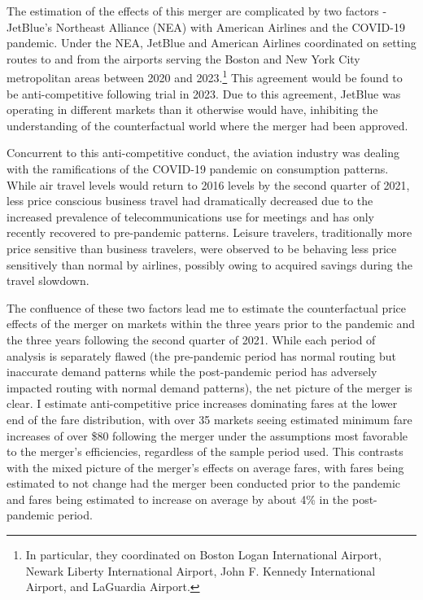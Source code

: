 \documentclass{article}
\begin{document}
    The estimation of the effects of this merger are complicated by two factors - JetBlue's Northeast Alliance (NEA) with American Airlines and the COVID-19 pandemic. Under the NEA, JetBlue and American Airlines coordinated on setting routes to and from the airports serving the Boston and New York City metropolitan areas between 2020 and 2023.\footnote{In particular, they coordinated on Boston Logan International Airport, Newark Liberty International Airport, John F. Kennedy International Airport, and LaGuardia Airport.} This agreement would be found to be anti-competitive following trial in 2023. Due to this agreement, JetBlue was operating in different markets than it otherwise would have, inhibiting the understanding of the counterfactual world where the merger had been approved.

    Concurrent to this anti-competitive conduct, the aviation industry was dealing with the ramifications of the COVID-19 pandemic on consumption patterns. While air travel levels would return to 2016 levels by the second quarter of 2021, less price conscious business travel had dramatically decreased due to the increased prevalence of telecommunications use for meetings and has only recently recovered to pre-pandemic patterns. Leisure travelers, traditionally more price sensitive than business travelers, were observed to be behaving less price sensitively than normal by airlines, possibly owing to acquired savings during the travel slowdown.

    The confluence of these two factors lead me to estimate the counterfactual price effects of the merger on markets within the three years prior to the pandemic and the three years following the second quarter of 2021. While each period of analysis is separately flawed (the pre-pandemic period has normal routing but inaccurate demand patterns while the post-pandemic period has adversely impacted routing with normal demand patterns), the net picture of the merger is clear. I estimate anti-competitive price increases dominating fares at the lower end of the fare distribution, with over 35 markets seeing estimated minimum fare increases of over \$80 following the merger under the assumptions most favorable to the merger's efficiencies, regardless of the sample period used. This contrasts with the mixed picture of the merger's effects on average fares, with fares being estimated to not change had the merger been conducted prior to the pandemic and fares being estimated to increase on average by about 4\% in the post-pandemic period. 
\end{document}
